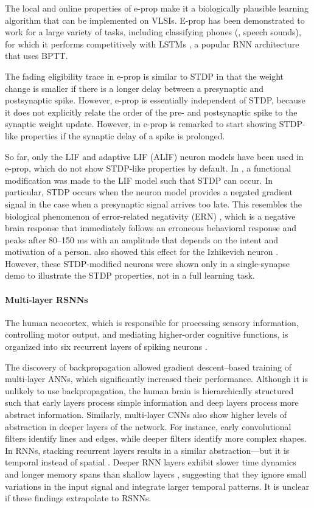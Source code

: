 The local and online properties of e-prop make it a biologically plausible learning algorithm that can be implemented on VLSIs.
E-prop has been demonstrated to work for a large variety of tasks, including classifying phones (\ie, speech sounds), for which it performs competitively with LSTMs \citep{graves2013speech}, a popular RNN architecture that uses BPTT.

The fading eligibility trace in e-prop is similar to STDP in that the weight change is smaller if there is a longer delay between a presynaptic and postsynaptic spike.
However, e-prop is essentially independent of STDP, because it does not explicitly relate the order of the pre- and postsynaptic spike to the synaptic weight update.
However, in \citet{bellec2020solution} e-prop is remarked to start showing STDP-like properties if the synaptic delay of a spike is prolonged.

So far, only the LIF and adaptive LIF (ALIF) neuron models have been used in e-prop, which do not show STDP-like properties by default.
In \citet{traub2020learning}, a functional modification was made to the LIF model such that STDP can occur.
In particular, STDP occurs when the neuron model provides a negated gradient signal in the case when a presynaptic signal arrives too late.
This resembles the biological phenomenon of error-related negativity (ERN) \citep{nieuwenhuis2001error}, which is a negative brain response that immediately follows an erroneous behavioral response and peaks after 80--150 ms with an amplitude that depends on the intent and motivation of a person.
\citet{traub2020learning} also showed this effect for the Izhikevich neuron \citep{izhikevich2003simple}.
However, these STDP-modified neurons were shown only in a single-synapse demo to illustrate the STDP properties, not in a full learning task.

\paragraph{Multi-layer RSNNs}
The human neocortex, which is responsible for processing sensory information, controlling motor output, and mediating higher-order cognitive functions, is organized into six recurrent layers of spiking neurons \citep{greig2013molecular}.

The discovery of backpropagation allowed gradient descent--based training of multi-layer ANNs, which significantly increased their performance.
Although it is unlikely to use backpropagation, the human brain is hierarchically structured such that early layers process simple information and deep layers process more abstract information.
Similarly, multi-layer CNNs also show higher levels of abstraction in deeper layers of the network.
For instance, early convolutional filters identify lines and edges, while deeper filters identify more complex shapes.
In RNNs, stacking recurrent layers results in a similar abstraction---but it is temporal instead of spatial \citep{hermans2013training,gallicchio2017deep}.
Deeper RNN layers exhibit slower time dynamics and longer memory spans than shallow layers \citep{gallicchio2018short}, suggesting that they ignore small variations in the input signal and integrate larger temporal patterns.
It is unclear if these findings extrapolate to RSNNs.

